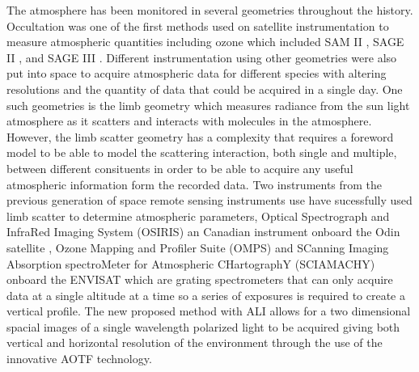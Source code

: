 \documentclass[12pt]{article}
\begin{document}
The atmosphere has been monitored in several geometries throughout the history. Occultation was one of the first methods used on satellite instrumentation to measure atmospheric quantities including ozone which included SAM II \citep{McCormick1979}, SAGE II \citep{McCormick1987}, and SAGE III \citep{Thomason2003}. Different instrumentation using other geometries were also put into space to acquire atmospheric data for different species with altering resolutions and the quantity of data that could be acquired in a single day. One such geometries is the limb geometry which measures radiance from the sun light atmosphere as it scatters and interacts with molecules in the atmosphere. However, the limb scatter geometry has a complexity that requires a foreword model to be able to model the scattering interaction, both single and multiple, between different consituents in order to be able to acquire any useful atmospheric information form the recorded data. Two instruments from the previous generation of space remote sensing instruments use have sucessfully used limb scatter to determine atmospheric parameters, Optical Spectrograph and InfraRed Imaging System (OSIRIS) an Canadian instrument onboard the Odin satellite \citep{Llewellyn2004}, Ozone Mapping and Profiler Suite (OMPS) \citep{Dittman2002} and SCanning Imaging Absorption spectroMeter for Atmospheric CHartographY (SCIAMACHY) onboard the ENVISAT \citep{Bovensmann1999} which are grating spectrometers that can only acquire data at a single altitude at a time so a series of exposures is required to create a vertical profile. The new proposed method with ALI allows for a two dimensional spacial images of a single wavelength polarized light to be acquired giving both vertical and horizontal resolution of the environment through the use of the innovative AOTF technology.
\end{document}
